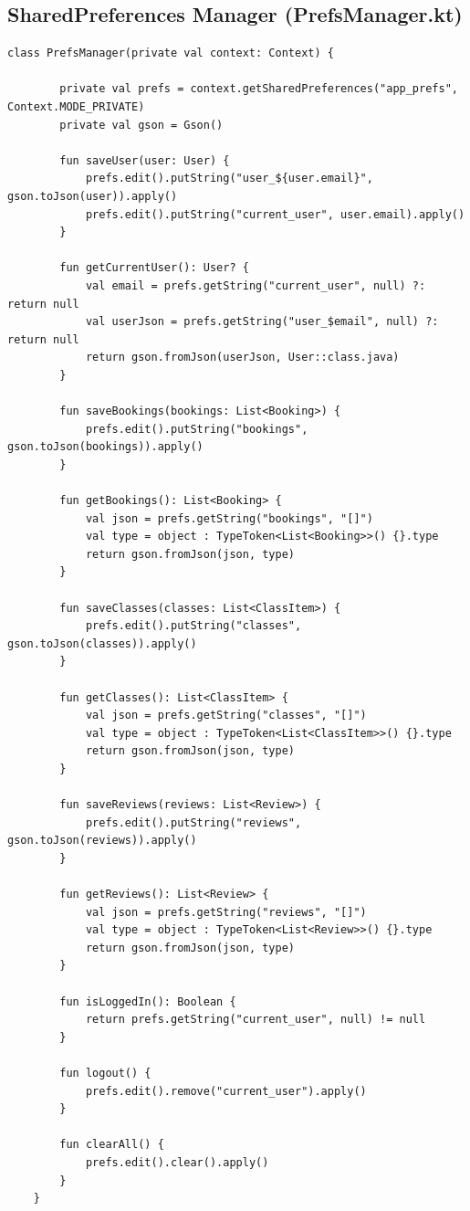 \subsection{SharedPreferences Manager (PrefsManager.kt)}

\begin{lstlisting}[breaklines=true]
	class PrefsManager(private val context: Context) {
		
		private val prefs = context.getSharedPreferences("app_prefs", Context.MODE_PRIVATE)
		private val gson = Gson()
		
		fun saveUser(user: User) {
			prefs.edit().putString("user_${user.email}", gson.toJson(user)).apply()
			prefs.edit().putString("current_user", user.email).apply()
		}
		
		fun getCurrentUser(): User? {
			val email = prefs.getString("current_user", null) ?: return null
			val userJson = prefs.getString("user_$email", null) ?: return null
			return gson.fromJson(userJson, User::class.java)
		}
		
		fun saveBookings(bookings: List<Booking>) {
			prefs.edit().putString("bookings", gson.toJson(bookings)).apply()
		}
		
		fun getBookings(): List<Booking> {
			val json = prefs.getString("bookings", "[]")
			val type = object : TypeToken<List<Booking>>() {}.type
			return gson.fromJson(json, type)
		}
		
		fun saveClasses(classes: List<ClassItem>) {
			prefs.edit().putString("classes", gson.toJson(classes)).apply()
		}
		
		fun getClasses(): List<ClassItem> {
			val json = prefs.getString("classes", "[]")
			val type = object : TypeToken<List<ClassItem>>() {}.type
			return gson.fromJson(json, type)
		}
		
		fun saveReviews(reviews: List<Review>) {
			prefs.edit().putString("reviews", gson.toJson(reviews)).apply()
		}
		
		fun getReviews(): List<Review> {
			val json = prefs.getString("reviews", "[]")
			val type = object : TypeToken<List<Review>>() {}.type
			return gson.fromJson(json, type)
		}
		
		fun isLoggedIn(): Boolean {
			return prefs.getString("current_user", null) != null
		}
		
		fun logout() {
			prefs.edit().remove("current_user").apply()
		}
		
		fun clearAll() {
			prefs.edit().clear().apply()
		}
	}
\end{lstlisting}